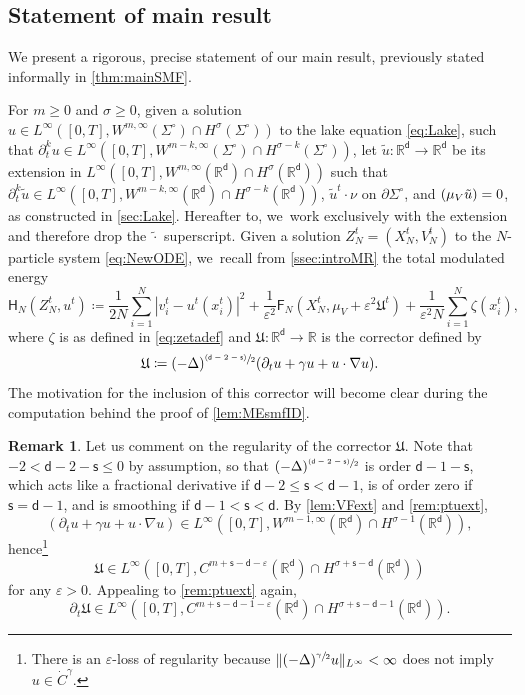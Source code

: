 \documentclass[10pt]{amsart}
\let\epsilon\varepsilon
\newcommand{\psfrac}[2]{\sfrac{(#1)}{#2}}
\newcommand{\Sigmacirc}{\Sigma^\circ}
\theoremstyle{plain}
\theoremstyle{definition}
\newtheorem{remark}[thm]{Remark}
\DeclarePairedDelimiter{\pa}{\lparen}{\rparen}
\let\div\relax
\DeclareMathOperator{\div}{\mathrm{div}}
\newcommand{\R}{{\mathbb{R}}}
\let\ga\gamma
\let\D\Delta
\let\vep\varepsilon
\let\p\partial
\let\tl\tilde
\let\ux X
\let\uz Z
\newcommand{\Uu}{\mathfrak{U}}
\newcommand{\Fr}{\mathsf{F}}
\newcommand{\Hr}{\mathsf{H}}
\renewcommand{\d}{\mathsf{d}}
\newcommand{\s}{\mathsf{s}}
\begin{document}
\subsection{Statement of main result}\label{ssec:MPmr}

We present a rigorous, precise statement of our main result, previously stated informally in \cref{thm:mainSMF}.

For $m\ge 0$ and $\sigma\ge 0$, given a solution $u \in L^\infty([0,T], W^{m,\infty}(\Sigmacirc) \cap H^\sigma(\Sigmacirc))$ to the lake equation \eqref{eq:Lake}, such that $\p_t^k u \in L^\infty([0,T], W^{m-k,\infty}(\Sigmacirc)\cap H^{\sigma-k}(\Sigmacirc))$, let $\tl u:\R^\d\to\R^\d$ be its extension in $L^\infty([0,T], W^{m,\infty}(\R^\d) \cap H^\sigma(\R^\d))$ such that $\p_t^k\tl{u} \in L^\infty([0,T], W^{m-k,\infty}(\R^\d)\cap H^{\sigma-k}(\R^\d))$, $\tl{u}^t\cdot\nu$ on $\p\Sigma^\circ$, and $\div(\mu_V\tl{u})=0$, as constructed in \cref{sec:Lake}. Hereafter to, we~work exclusively with the extension and therefore drop the $\tl{\cdot}$ superscript. Given a solution $\uz_N^t = (\ux_N^t,V_N^t)$ to the $N$-particle system \eqref{eq:NewODE}, we~recall from \cref{ssec:introMR} the {total modulated energy}\vspace*{-3pt}\enlargethispage{\baselineskip}
\begin{equation}\label{eq:MEcon}
\Hr_{N}(\uz_N^t,u^t) \coloneqq \frac{1}{2N}\sum_{i=1}^N |v_i^t-u^t(x_i^t)|^2 + \frac{1}{\vep^2}\Fr_N(\ux_N^t,\mu_V+\vep^2\Uu^t) + \frac{1}{\vep^2 N}\sum_{i=1}^N \zeta(x_i^t),
\end{equation}
where $\zeta$ is as defined in \eqref{eq:zetadef} and $\Uu:\R^\d\to\R$ is the corrector defined by\vspace*{-3pt}
\begin{equation}\label{eq:Uudef}
\Uu \coloneqq (-\D)^{\psfrac{\d-2-\s}{2}}\div\pa*{\p_t u+\ga u + u\cdot\nabla u}.
\end{equation}
The motivation for the inclusion of this corrector will become clear during the computation behind the proof of \cref{lem:MEsmfID}.

\begin{remark}
Let us comment on the regularity of the corrector $\Uu$. Note that $-2 <\d-2-\s \le 0$ by assumption, so that $(-\D)^{\psfrac{\d-2-\s}{2}}\div$ is order $\d-1-\s$, which acts like a fractional derivative if $\d-2\leq \s<\d-1$, is of order zero if $\s=\d-1$, and is smoothing if $\d-1<\s<\d$. By \cref{lem:VFext} and \cref{rem:ptuext},\vspace*{-3pt}
\[
(\p_t u+\ga u + u\cdot\nabla u)\in L^\infty([0,T], W^{m-1,\infty}(\R^\d) \cap H^{\sigma-1}(\R^\d)),
\]
hence\footnote{There is an $\epsilon$-loss of regularity because $\|(-\Delta)^{\sfrac{\ga}{2}}u\|_{L^\infty} < \infty$ does not imply $u\in \dot{C}^{\ga}$.}\vspace*{-3pt}
\[
\Uu \in L^\infty([0,T], C^{m+\s-\d-\epsilon}(\R^\d)\cap H^{\sigma+\s-\d}(\R^\d))
\]
for any $\epsilon>0$. Appealing to \cref{rem:ptuext} again,\vspace*{-3pt}
\[
\p_t\Uu\in L^\infty([0,T], C^{m+\s-\d-1-\epsilon}(\R^\d)\cap H^{\sigma+\s-\d-1}(\R^\d)).
\]
\end{remark}
\end{document}
